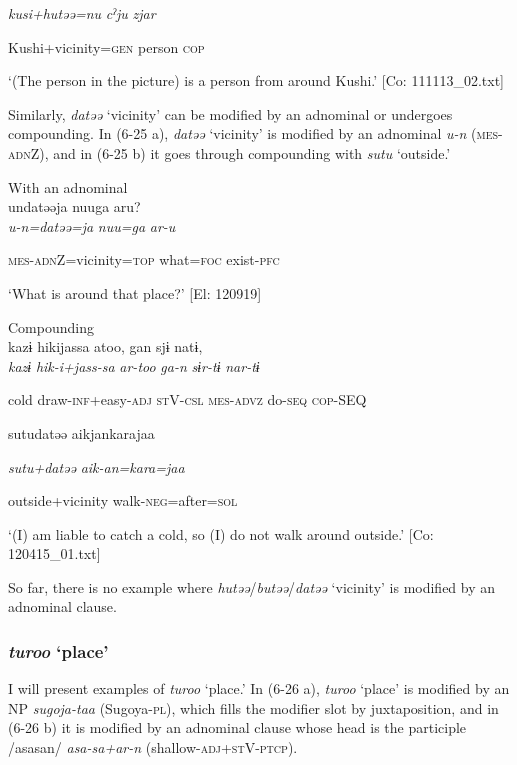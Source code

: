       \textit{kusi+hutəə=nu}  \textit{cˀju}  \textit{zjar}

      Kushi+vicinity=\textsc{gen}  person  \textsc{cop}

\glt ‘(The person in the picture) is a person from around Kushi.’ [Co: 111113\_02.txt]
\z

Similarly, \textit{datəə} ‘vicinity’ can be modified by an adnominal or undergoes compounding. In (6-25 a), \textit{datəə} ‘vicinity’ is modified by an adnominal \textit{u-n} (\textsc{mes}-\textsc{adn}Z), and in (6-25 b) it goes through compounding with \textit{sutu} ‘outside.’

\ea\label{ex:6-25}
\ea With an adnominal\\
{\TM}
\gll  undatəəja  nuuga  aru?\\

      \textit{u-n=datəə=ja}  \textit{nuu=ga}  \textit{ar-u}

      \textsc{mes}-\textsc{adn}Z=vicinity=\textsc{top}  what=\textsc{foc}  exist-\textsc{pfc}

\glt ‘What is around that place?’ [El: 120919]

 \ex Compounding\\
{\TM}
\gll  kazɨ  hikijassa  atoo,  gan  sjɨ  natɨ,\\

      \textit{kazɨ}  \textit{hik-i+jass-sa}  \textit{ar-too}  \textit{ga-n}  \textit{sɨr-tɨ}  \textit{nar-tɨ}

      cold  draw-\textsc{inf}+easy-\textsc{adj}  \textsc{st}V-\textsc{csl}  \textsc{mes}-\textsc{advz}  do-\textsc{seq}  \textsc{cop}-SEQ

      sutudatəə  aikjankarajaa

      \textit{sutu+datəə}  \textit{aik-an=kara=jaa}

      outside+vicinity  walk-\textsc{neg}=after=\textsc{sol}

\glt ‘(I) am liable to catch a cold, so (I) do not walk around outside.’ [Co: 120415\_01.txt]
\z

So far, there is no example where \textit{hutəə}/\textit{butəə}/\textit{datəə} ‘vicinity’ is modified by an adnominal clause.

\subsubsection{ \textit{turoo} ‘place’}

I will present examples of \textit{turoo} ‘place.’ In (6-26 a), \textit{turoo} ‘place’ is modified by an NP \textit{sugoja-taa} (Sugoya-\textsc{pl}), which fills the modifier slot by juxtaposition, and in (6-26 b) it is modified by an adnominal clause whose head is the participle /asasan/ \textit{asa-sa+ar-n} (shallow-\textsc{adj}+\textsc{st}V-\textsc{ptcp}).

